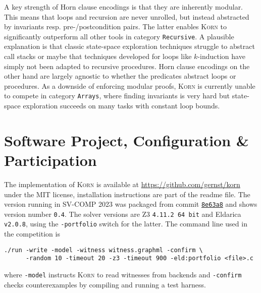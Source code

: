 \documentclass{llncs}
\newcommand{\Korn}{\textsc{Korn}\xspace}
\begin{document}
A key strength of Horn clause encodings is that they are inherently modular.
This means that loops and recursion are never unrolled,
but instead abstracted by invariants resp. pre-/postcondition pairs.
The latter enables \Korn to significantly outperform all other tools in category \texttt{Recursive}.
A plausible explanation is that classic state-space exploration techniques
struggle to abstract call stacks or maybe that techniques developed for loops
like $k$-induction have simply not been adapted to recursive procedures.
Horn clause encodings on the other hand are largely agnostic
to whether the predicates abstract loops or procedures.
As a downside of enforcing modular proofs,
\Korn is currently unable to compete in category \texttt{Arrays},
where finding invariants is very hard but state-space exploration succeeds
on many tasks with constant loop bounds.

\section{Software Project, Configuration \& Participation}
\label{sec:project}

The implementation of \Korn is available at
    \url{https://github.com/gernst/korn} under the MIT license,
installation instructions are part of the readme file.
The version running in SV-COMP 2023 was packaged from commit
\href{https://github.com/gernst/korn/commit/8e968dd9e1498d358270d1e78d473befca8e63a8}{\tt 8e63a8}
and shows version number \texttt{0.4}.
The solver versions are Z3 \texttt{4.11.2 64 bit} and Eldarica \texttt{v2.0.8}, using the \texttt{-portfolio} switch for the latter.
The command line used in the competition is
\begin{verbatim}
./run -write -model -witness witness.graphml -confirm \
      -random 10 -timeout 20 -z3 -timeout 900 -eld:portfolio <file>.c
\end{verbatim}
where \texttt{-model} instructs \Korn to read witnesses from backends
and \texttt{-confirm} checks counterexamples
by compiling and running a test harness.
\end{document}
